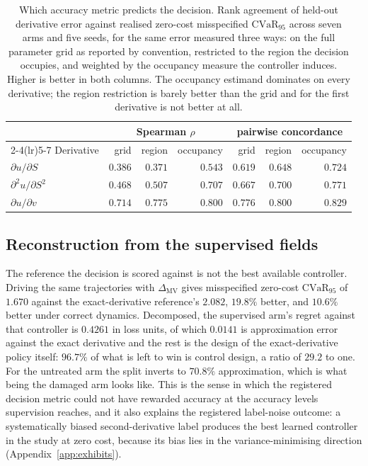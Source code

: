 \documentclass{article}
\begin{document}
\begin{table}[!htbp]
\caption{Which accuracy metric predicts the decision. Rank agreement of held-out
derivative error against realised zero-cost misspecified $\mathrm{CVaR}_{95}$ across
seven arms and five seeds, for the same error measured three ways: on the full
parameter grid as reported by convention, restricted to the region the decision
occupies, and weighted by the occupancy measure the controller induces. Higher is
better in both columns. The occupancy estimand dominates on every derivative; the
region restriction is barely better than the grid and for the first derivative is
not better at all.}
\label{tab:metric}
\centering\footnotesize\setlength{\tabcolsep}{6pt}
\begin{tabular}{@{}lrrrrrr@{}}
\toprule
& \multicolumn{3}{c}{Spearman $\rho$} & \multicolumn{3}{c}{pairwise concordance} \\
\cmidrule(lr){2-4}\cmidrule(lr){5-7}
Derivative & grid & region & occupancy & grid & region & occupancy \\
\midrule
$\partial u/\partial S$ & $0.386$ & $0.371$ & $\mathbf{0.543}$ & $0.619$ & $0.648$ & $\mathbf{0.724}$ \\
$\partial^{2}u/\partial S^{2}$ & $0.468$ & $0.507$ & $\mathbf{0.707}$ & $0.667$ & $0.700$ & $\mathbf{0.771}$ \\
$\partial u/\partial v$ & $0.714$ & $0.775$ & $\mathbf{0.800}$ & $0.776$ & $0.800$ & $\mathbf{0.829}$ \\
\bottomrule
\end{tabular}
\end{table}

\subsection{Reconstruction from the supervised fields}
\label{sec:mvbuild}

The reference the decision is scored against is not the best available controller.
Driving the same trajectories with $\Delta_{\mathrm{MV}}$ gives misspecified
zero-cost $\mathrm{CVaR}_{95}$ of $1.670$ against the exact-derivative reference's
$2.082$, $19.8\%$ better, and $10.6\%$ better under correct dynamics. Decomposed,
the supervised arm's regret against that controller is $0.4261$ in loss units, of
which $0.0141$ is approximation error against the exact derivative and the rest is
the design of the exact-derivative policy itself: $96.7\%$ of what is left to win is
control design, a ratio of $29.2$ to one. For the untreated arm the split inverts to
$70.8\%$ approximation, which is what being the damaged arm looks like. This is the
sense in which the registered decision metric could not have rewarded accuracy at
the accuracy levels supervision reaches, and it also explains the registered
label-noise outcome: a systematically biased second-derivative label produces the
best learned controller in the study at zero cost, because its bias lies in the
variance-minimising direction (Appendix~\ref{app:exhibits}).
\end{document}
